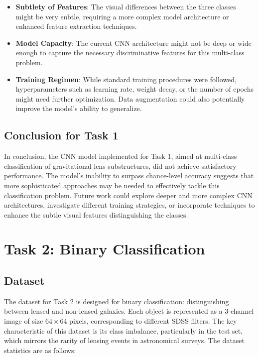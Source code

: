 \documentclass[11pt,a4paper]{article}
\begin{document}
\begin{itemize}
    \item \textbf{Subtlety of Features}: The visual differences between the three classes might be very subtle, requiring a more complex model architecture or enhanced feature extraction techniques.
    \item \textbf{Model Capacity}: The current CNN architecture might not be deep or wide enough to capture the necessary discriminative features for this multi-class problem.
    \item \textbf{Training Regimen}:  While standard training procedures were followed, hyperparameters such as learning rate, weight decay, or the number of epochs might need further optimization. Data augmentation could also potentially improve the model's ability to generalize.
\end{itemize}

\subsection{Conclusion for Task 1}
In conclusion, the CNN model implemented for Task 1, aimed at multi-class classification of gravitational lens substructures, did not achieve satisfactory performance. The model's inability to surpass chance-level accuracy suggests that more sophisticated approaches may be needed to effectively tackle this classification problem. Future work could explore deeper and more complex CNN architectures, investigate different training strategies, or incorporate techniques to enhance the subtle visual features distinguishing the classes.


\section{Task 2: Binary Classification}

\subsection{Dataset}
The dataset for Task 2 is designed for binary classification: distinguishing between lensed and non-lensed galaxies. Each object is represented as a 3-channel image of size $64 \times 64$ pixels, corresponding to different SDSS filters. The key characteristic of this dataset is its class imbalance, particularly in the test set, which mirrors the rarity of lensing events in astronomical surveys. The dataset statistics are as follows:
\end{document}
